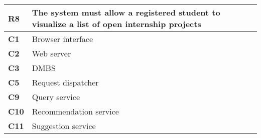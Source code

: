 \begin{table}[H]
    \centering
    \begin{tabular}{|l|m{10cm}|}
        \hline \textbf{R8} & The system must allow a registered student to visualize a list of open internship projects \\
        \hline \textbf{C1} & Browser interface \\
        \hline \textbf{C2} & Web server \\
        \hline \textbf{C3} & DMBS \\
        \hline \textbf{C5} & Request dispatcher \\
        \hline \textbf{C9} & Query service \\
        \hline \textbf{C10} & Recommendation service \\
        \hline \textbf{C11} & Suggestion service \\
        \hline
    \end{tabular}
\end{table}

